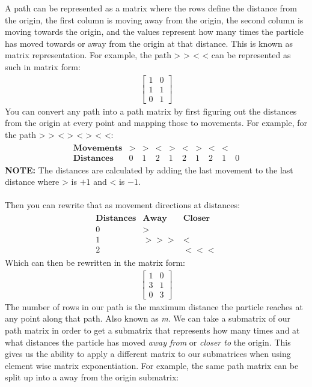 \documentclass[letterpaper, 12pt]{report}
\begin{document}
A path can be represented as a matrix where the rows define the distance from
the origin, the first column is moving away from the origin, the second column
is moving towards the origin, and the values represent how many times the
particle has moved towards or away from the origin at that distance. This is known as matrix representation. For
example, the path > > < < can be represented as such in matrix form:
\begin{align*}
	\begin{bmatrix}
		1 & 0 \\ 1 & 1 \\ 0 & 1
	\end{bmatrix}
\end{align*}
You can convert any path into a path matrix by first figuring out the distances from the origin at every point and mapping those to movements. For example, for the path > > < > < > < <:
\begin{align*}
	\begin{matrix}
		{\textbf{Movements}} & > & > & < & > & < & > & < & <     \\
		{\textbf{Distances}} & 0 & 1 & 2 & 1 & 2 & 1 & 2 & 1 & 0
	\end{matrix}
\end{align*}
\textbf{NOTE:} The distances are calculated by adding the last movement to the last distance where > is $+1$ and < is $-1$.
\\
\\
Then you can rewrite that as movement directions at distances:
\begin{align*}
	\begin{matrix}
		{\textbf{Distances}} & {\textbf{Away}} & {\textbf{Closer}} \\
		0                    & >                                   \\
		1                    & > > >           & <                 \\
		2                    &                 & < < <
	\end{matrix}
\end{align*}
Which can then be rewritten in the matrix form:
\begin{align*}
	\begin{bmatrix}
		1 & 0 \\
		3 & 1 \\
		0 & 3
	\end{bmatrix}
\end{align*}
The number of rows in our path is the maximum distance the particle reaches at any point along that path. Also known as \textit{m}. We can take a submatrix of our path matrix in order to get a submatrix that represents how many times and at what distances the particle has moved \textit{away from} or \textit{closer to} the origin. This gives us the ability to apply a different matrix to our submatrices when using element wise matrix exponentiation. For example, the same path matrix can be split up into a away from the origin submatrix:
\end{document}
